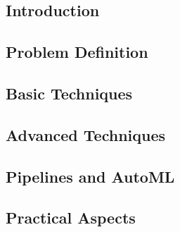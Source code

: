 

\subsection{Introduction}


\subsection{Problem Definition}


\subsection{Basic Techniques}


\subsection{Advanced Techniques}


\subsection{Pipelines and AutoML}


\subsection{Practical Aspects}
